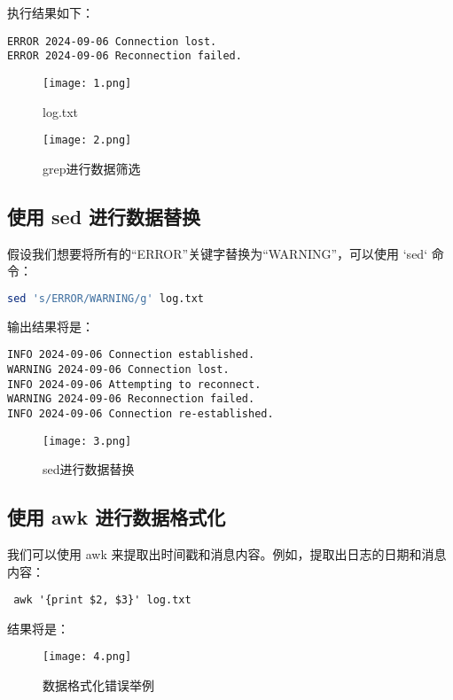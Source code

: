 \documentclass[a4paper, 12pt]{article}
\begin{document}
执行结果如下：

\begin{lstlisting}
ERROR 2024-09-06 Connection lost.
ERROR 2024-09-06 Reconnection failed.
\end{lstlisting}

\begin{figure}[H]
  \centering
    \texttt{[image: 1.png]}
  \caption{log.txt}
   \end{figure}
   
\begin{figure}[H]
  \centering
    \texttt{[image: 2.png]}
  \caption{grep进行数据筛选}
   \end{figure}

\subsection{使用 sed 进行数据替换}
假设我们想要将所有的“ERROR”关键字替换为“WARNING”，可以使用 `sed` 命令：

\begin{lstlisting}[language=bash]
sed 's/ERROR/WARNING/g' log.txt
\end{lstlisting}

输出结果将是：

\begin{lstlisting}
INFO 2024-09-06 Connection established.
WARNING 2024-09-06 Connection lost.
INFO 2024-09-06 Attempting to reconnect.
WARNING 2024-09-06 Reconnection failed.
INFO 2024-09-06 Connection re-established.
\end{lstlisting}

\begin{figure}[H]
  \centering
    \texttt{[image: 3.png]}
  \caption{sed进行数据替换}
   \end{figure}

\subsection{使用 awk 进行数据格式化}
我们可以使用 awk 来提取出时间戳和消息内容。例如，提取出日志的日期和消息内容：

\begin{verbatim}
 awk '{print $2, $3}' log.txt
  \end{verbatim}
结果将是：

\begin{figure}[H]
  \centering
    \texttt{[image: 4.png]}
  \caption{数据格式化错误举例}
   \end{figure}
   
\end{document}
